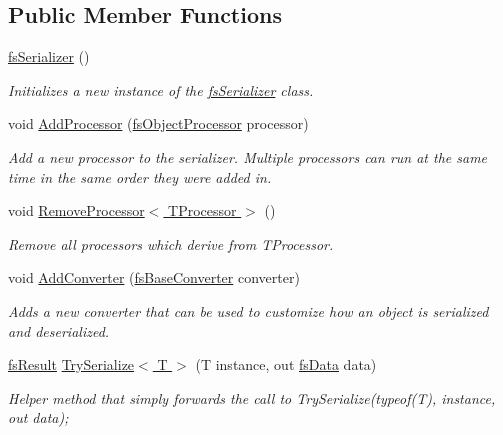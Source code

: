 \subsection*{Public Member Functions}
\begin{DoxyCompactItemize}
\item 
\hyperlink{class_full_serializer_1_1fs_serializer_a1b55c4158e74f88a916214128f345e7d}{fs\+Serializer} ()
\begin{DoxyCompactList}\small\item\em Initializes a new instance of the \hyperlink{class_full_serializer_1_1fs_serializer}{fs\+Serializer} class. \end{DoxyCompactList}\item 
void \hyperlink{class_full_serializer_1_1fs_serializer_a30ed281d93548dcb4deea1815096f87b}{Add\+Processor} (\hyperlink{class_full_serializer_1_1fs_object_processor}{fs\+Object\+Processor} processor)
\begin{DoxyCompactList}\small\item\em Add a new processor to the serializer. Multiple processors can run at the same time in the same order they were added in. \end{DoxyCompactList}\item 
void \hyperlink{class_full_serializer_1_1fs_serializer_ae4ee8d86aefa7d639f2c63552ad2ec3a}{Remove\+Processor$<$ T\+Processor $>$} ()
\begin{DoxyCompactList}\small\item\em Remove all processors which derive from T\+Processor. \end{DoxyCompactList}\item 
void \hyperlink{class_full_serializer_1_1fs_serializer_aa9f27b67927f4e097ba578dd4d0145d2}{Add\+Converter} (\hyperlink{class_full_serializer_1_1fs_base_converter}{fs\+Base\+Converter} converter)
\begin{DoxyCompactList}\small\item\em Adds a new converter that can be used to customize how an object is serialized and deserialized. \end{DoxyCompactList}\item 
\hyperlink{struct_full_serializer_1_1fs_result}{fs\+Result} \hyperlink{class_full_serializer_1_1fs_serializer_a3b8863c9ebd9f7de51e0f77e6421f07c}{Try\+Serialize$<$ T $>$} (T instance, out \hyperlink{class_full_serializer_1_1fs_data}{fs\+Data} data)
\begin{DoxyCompactList}\small\item\em Helper method that simply forwards the call to Try\+Serialize(typeof(\+T), instance, out data); \end{DoxyCompactList}\item 

\end{DoxyCompactItemize}
